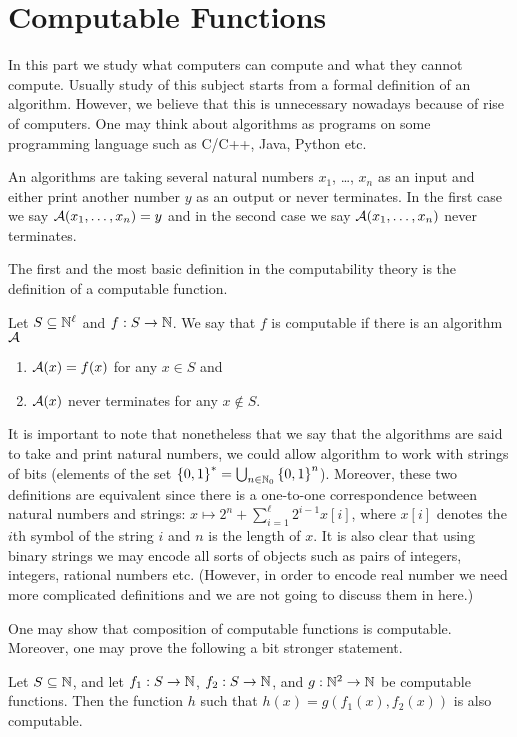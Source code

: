 \chapter{Computable Functions}
In this part we study what computers can compute and what they cannot compute.
Usually study of this subject starts from a formal definition of an algorithm.
However, we believe that this is unnecessary nowadays because of rise of
computers. One may think about algorithms as programs on some programming
language such as C/C++, Java, Python etc.

An algorithms are taking several natural numbers $x_1$, \dots, $x_n$
as an input and either print another number $y$ as an output or never
terminates. In the first case we say $\mathcal{A}(x_1, \dots, x_n) = y$
and in the second case we say $\mathcal{A}(x_1, \dots, x_n)$ never terminates.

The first and the most basic definition in the computability theory is the
definition of a computable function.
\begin{definition}
    Let $S \subseteq \mathbb{N}^\ell$ and $f : S \to \mathbb{N}$.
    We say that $f$ is computable if there is an algorithm $\mathcal{A}$
    \begin{enumerate}
        \item $\mathcal{A}(x) = f(x)$ for any $x \in S$ and
        \item $\mathcal{A}(x)$ never terminates for any $x \notin S$.
    \end{enumerate}
\end{definition}

It is important to note that nonetheless that we say that the algorithms are
said to take and print natural numbers, we could allow algorithm to work with
strings of bits (elements of the set
$\set{0, 1}^* = \bigcup_{n \in \N_0} \set{0, 1}^n$).
Moreover, these two definitions are  equivalent since there is a one-to-one
correspondence between natural numbers and strings:
$x \mapsto 2^n + \sum_{i = 1}^\ell 2^{i - 1} x[i]$, where $x[i]$ denotes the
$i$th symbol of the string $i$ and $n$ is the length of $x$.
It is also clear that using binary strings we may encode all sorts of objects
such as pairs of integers, integers, rational numbers etc. (However, in order
to encode real number we need more complicated definitions and we are not
going to discuss them in here.)

One may show that composition of computable functions is computable.
Moreover, one may prove the following a bit stronger statement.
\begin{theorem}
\label{theorem:composition-computable}
    Let $S \subseteq \mathbb{N}$, and let
    $f_1 : S \to \mathbb{N}$, $f_2 : S \to \mathbb{N}$, and $g : \mathbb{N}^2 \to \mathbb{N}$ be computable
    functions. Then the function $h$ such that $h(x) = g(f_1(x), f_2(x))$
    is also computable.
\end{theorem}

